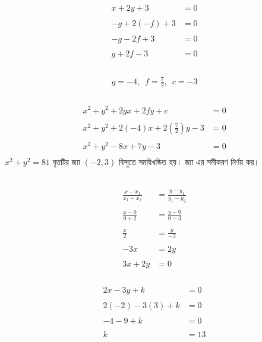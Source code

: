 \documentclass{article}
\begin{document}
\\
\begin{align*}
	x+2y+3&=0\\
	\\
	-g+2(-f)+3&=0\\
	\\
	-g-2f+3&=0\\
	\\
	g+2f-3&=0\\
\end{align*}
\\
\begin{align*}
	g=-4,\,\,\,f=\frac{7}{2},\,\,\,c=-3\\
\end{align*}
\\
\begin{align*}
	x^2+y^2+2gx+2fy+c&=0\\
	\\
	x^2+y^2+2(-4)x+2(\frac{7}{2})y-3&=0\\
	\\
	x^2+y^2-8x+7y-3&=0\\
\end{align*}
$x^2+y^2=81$ বৃত্তটির জ্যা  $(-2,3)$ বিন্দুতে সমদ্বিখন্ডিত হয়। জ্যা এর সমীকরণ নির্ণয় কর।\\  
 \\
\begin{align*}
	\frac{x-x_1}{x_1-x_2} &=\frac{y-y_1}{y_1-y_2}\\
	\\
	\frac{x-0}{0+2}&=\frac{y-0}{0-3}\\
	\\
	\frac{x}{2}&=\frac{y}{-3}\\
	\\
	-3x&=2y\\
	\\
	3x+2y&=0\\
\end{align*}
\\
\begin{align*}
	2x-3y+k&=0\\
	\\
	2(-2)-3(3)+k&=0\\
	\\
	-4-9+k&=0\\
	\\
	k&=13\\
\end{align*}
\end{document}
